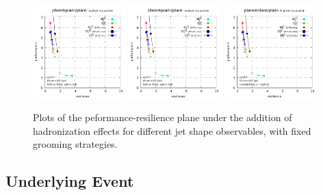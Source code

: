 \documentclass[11pt,letterpaper]{article}
\begin{document}
\begin{figure}
  \includegraphics[width=0.32\textwidth,page=61]{figures/shape-scan-levels.pdf}
  \hfill
  \includegraphics[width=0.32\textwidth,page=55]{figures/shape-scan-levels.pdf}
  \hfill
  \includegraphics[width=0.32\textwidth,page=49]{figures/shape-scan-levels.pdf}
  \caption{Plots of the peformance-resilience plane under the addition of hadronization effects for different jet shape observables, with fixed grooming strategies.}\label{fig:shapes-hadronisation}
\end{figure}






\subsection{Underlying Event}\label{sec:UE}
\end{document}
